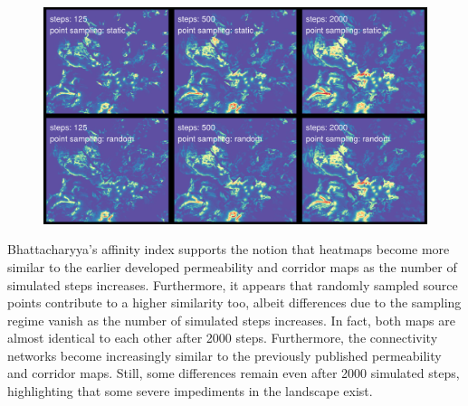 \documentclass[abstract=on,10pt,a4paper,bibliography=totocnumbered]{article}
\begin{document}
\begin{figure}
  \includegraphics[width=\textwidth]{99_Heatmaps}
  \caption{}
  \label{Heatmaps}
\end{figure}

Bhattacharyya's affinity index supports the notion that heatmaps become more
similar to the earlier developed permeability and corridor maps as the number of
simulated steps increases. Furthermore, it appears that randomly sampled source
points contribute to a higher similarity too, albeit differences due to the
sampling regime vanish as the number of simulated steps increases. In fact, both
maps are almost identical to each other after 2000 steps. Furthermore, the
connectivity networks become increasingly similar to the previously published
permeability and corridor maps. Still, some differences remain even after 2000
simulated steps, highlighting that some severe impediments in the landscape
exist.
\end{document}
